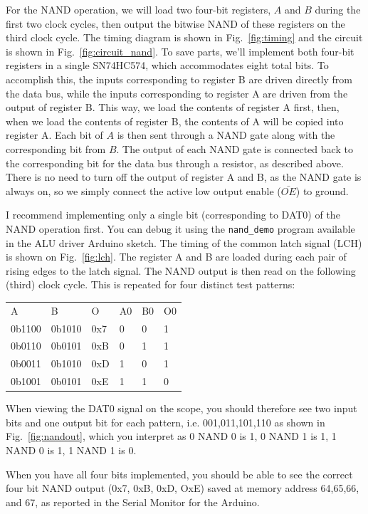 \documentclass[12pt]{article}
\begin{document}
For the NAND operation, we will load two four-bit registers, $A$ and $B$ during the first two clock cycles, then output the bitwise NAND of these registers on the third clock cycle.  The timing diagram is shown in Fig.~\ref{fig:timing} and the circuit is shown in Fig.~\ref{fig:circuit_nand}.  To save parts, we'll implement both four-bit registers in a single SN74HC574, which accommodates eight total bits.  To accomplish this, the inputs corresponding to register B are driven directly from the data bus, while the inputs corresponding to register A are driven from the output of register B.  This way, we load the contents of register A first, then, when we load the contents of register B, the contents of A will be copied into register A.  Each bit of $A$ is then sent through a NAND gate along with the corresponding bit from $B$.  The output of each NAND gate is connected back to the corresponding bit for the data bus through a resistor, as described above.  There is no need to turn off the output of register A and B, as the NAND gate is always on, so we simply connect the active low output enable ($\bar{OE}$) to ground.

I recommend implementing only a single bit (corresponding to DAT0) of the NAND operation first.  You can debug it using the {\tt nand\_demo} program available in the ALU driver Arduino sketch.  The timing of the common latch signal (LCH) is shown on Fig.~\ref{fig:lch}.  The register A and B are loaded during each pair of rising edges to the latch signal.  The NAND output is then read on the following (third) clock cycle.  This is repeated for four distinct test patterns:\\
\begin{center}
\begin{tabular}{llllll}
A & B & O & A0 & B0 & O0 \\
0b1100 & 0b1010 & 0x7 & 0 & 0 & 1 \\
0b0110 & 0b0101 & 0xB & 0 & 1 & 1 \\
0b0011 & 0b1010 & 0xD & 1 & 0 & 1 \\
0b1001 & 0b0101 & 0xE & 1 & 1 & 0 \\
\end{tabular}
\end{center}
When viewing the DAT0 signal on the scope, you should therefore see two input bits and one output bit for each pattern, i.e. 001,011,101,110 as shown in Fig.~\ref{fig:nandout}, which you interpret as 0 NAND 0 is 1, 0 NAND 1 is 1, 1 NAND 0 is 1, 1 NAND 1 is 0.  

When you have all four bits implemented, you should be able to see the correct four bit NAND output (0x7, 0xB, 0xD, OxE) saved at memory address 64,65,66, and 67, as reported in the Serial Monitor for the Arduino.
\end{document}
